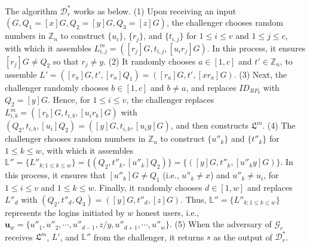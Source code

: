 The algorithm $\mathcal{D}^*_r$ works as below. (1) Upon receiving an input $(G, Q_1=[x]G, Q_2=[y]G, Q_3=[z]G)$, %
the challenger
chooses random numbers in $\mathbb{Z}_n$ to construct $\{u_i\}$, $\{r_j\}$, and $\{t_{i, j}\}$ for $1 \le i \le v$ and $1 \le j \le c$, with which it assembles $L^m_{i, j}=([r_j]G, t_{i,j}, [u_ir_j]G)$.
In this process, it ensures $[r_{j}]G \neq Q_2$ so that $r_j \neq y$.  %
(2) It randomly chooses $a \in [1, c]$ and $t' \in \mathbb{Z}_n$, to assemble $L' = ([r_{a}]G, t', [r_{a}]Q_1) = ([r_{a}]G, t', [xr_{a}]G)$.
(3)
Next, the challenger randomly chooses $b \in [1, c]$ and $b \neq a$, and replaces $ID_{RP_b}$ with $Q_2 = [y]G$.
Hence, for $1 \le i \le v$, the challenger replaces $L^m_{i, b}=([r_b]G, t_{i,b}, [u_ir_b]G)$ with $(Q_2, t_{i,b}, [u_i]Q_2) = ([y]G, t_{i,b}, [u_iy]G)$, and then constructs $\mathfrak{L}^m$.
(4) The challenger chooses random numbers in $\mathbb{Z}_n$ to construct $\{u''_k\}$ and $\{t''_k\}$ for $1 \leq k \leq w$,
 with which it assembles $\mathbb{L}'' = \{L''_{k; 1\leq k \leq w}\} = \{(Q_2, t''_k, [u''_k]Q_2)\} = \{([y]G, t''_k, [u''_ky]G)\}$.
In this process, it ensures that $[u''_k]G \neq Q_1$ (i.e., $u''_k \neq x$) and $u''_k \neq u_i$,
 for $1 \le i \le v$ and $1 \le k \le w$.
Finally, it randomly chooses $d \in [1, w]$ and replaces $L''_{d}$ with $(Q_2, t''_d, Q_3) = ([y]G, t''_d, [z]G)$.
 Thus, $\mathbb{L}'' = \{L''_{k;1\leq k \leq w}\}$ represents the logins initiated by $w$ honest users, i.e., $\mathbf{u}_w=\{u''_1, u''_2, \cdots, u''_{d-1}, z/y, u''_{d+1}, \cdots, u''_w\}$.
 (5) When the adversary of $\mathcal{G}_r$ receives $\mathfrak{L}^m$, $L'$, and $\mathbb{L}''$ from the challenger, it returns $s$ as the output of $\mathcal{D}^*_r$.

